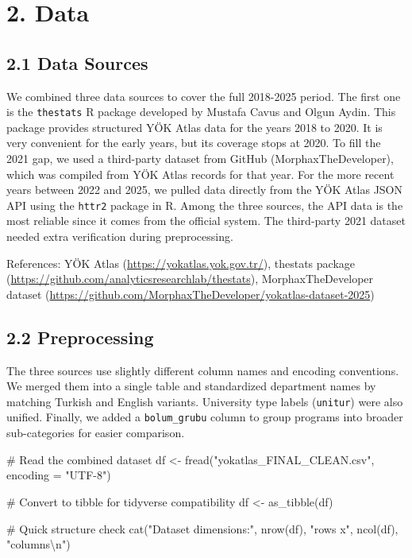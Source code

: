 \documentclass[
  11pt,
  a4paper,
  DIV=11,
  numbers=noendperiod]{scrartcl}
\newenvironment{Shaded}{\begin{snugshade}}{\end{snugshade}}
\newcommand{\AttributeTok}[1]{\textcolor[rgb]{0.40,0.45,0.13}{#1}}
\newcommand{\CommentTok}[1]{\textcolor[rgb]{0.37,0.37,0.37}{#1}}
\newcommand{\FunctionTok}[1]{\textcolor[rgb]{0.28,0.35,0.67}{#1}}
\newcommand{\NormalTok}[1]{\textcolor[rgb]{0.00,0.23,0.31}{#1}}
\newcommand{\OtherTok}[1]{\textcolor[rgb]{0.00,0.23,0.31}{#1}}
\newcommand{\SpecialCharTok}[1]{\textcolor[rgb]{0.37,0.37,0.37}{#1}}
\newcommand{\StringTok}[1]{\textcolor[rgb]{0.13,0.47,0.30}{#1}}
\begin{document}
\section{2. Data}\label{data}

\subsection{2.1 Data Sources}\label{data-sources}

We combined three data sources to cover the full 2018-2025 period. The
first one is the \texttt{thestats} R package developed by Mustafa Cavus
and Olgun Aydin. This package provides structured YÖK Atlas data for the
years 2018 to 2020. It is very convenient for the early years, but its
coverage stops at 2020. To fill the 2021 gap, we used a third-party
dataset from GitHub (MorphaxTheDeveloper), which was compiled from YÖK
Atlas records for that year. For the more recent years between 2022 and
2025, we pulled data directly from the YÖK Atlas JSON API using the
\texttt{httr2} package in R. Among the three sources, the API data is
the most reliable since it comes from the official system. The
third-party 2021 dataset needed extra verification during preprocessing.

References: YÖK Atlas (\url{https://yokatlas.yok.gov.tr/}), thestats
package (\url{https://github.com/analyticsresearchlab/thestats}),
MorphaxTheDeveloper dataset
(\url{https://github.com/MorphaxTheDeveloper/yokatlas-dataset-2025})

\subsection{2.2 Preprocessing}\label{preprocessing}

The three sources use slightly different column names and encoding
conventions. We merged them into a single table and standardized
department names by matching Turkish and English variants. University
type labels (\texttt{unitur}) were also unified. Finally, we added a
\texttt{bolum\_grubu} column to group programs into broader
sub-categories for easier comparison.

\begin{Shaded}
\begin{Highlighting}[]
\CommentTok{\# Read the combined dataset}
\NormalTok{df }\OtherTok{\textless{}{-}} \FunctionTok{fread}\NormalTok{(}\StringTok{"yokatlas\_FINAL\_CLEAN.csv"}\NormalTok{, }\AttributeTok{encoding =} \StringTok{"UTF{-}8"}\NormalTok{)}

\CommentTok{\# Convert to tibble for tidyverse compatibility}
\NormalTok{df }\OtherTok{\textless{}{-}} \FunctionTok{as\_tibble}\NormalTok{(df)}

\CommentTok{\# Quick structure check}
\FunctionTok{cat}\NormalTok{(}\StringTok{"Dataset dimensions:"}\NormalTok{, }\FunctionTok{nrow}\NormalTok{(df), }\StringTok{"rows x"}\NormalTok{, }\FunctionTok{ncol}\NormalTok{(df), }\StringTok{"columns}\SpecialCharTok{\textbackslash{}n}\StringTok{"}\NormalTok{)}
\end{Highlighting}
\end{Shaded}
\end{document}
